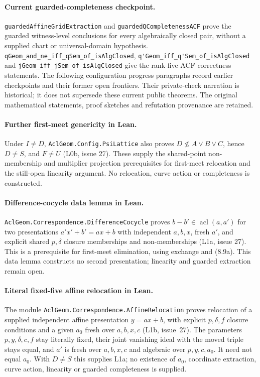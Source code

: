 \documentclass[11pt,oneside]{article}
\theoremstyle{definition}
\theoremstyle{remark}
\newcommand{\acl}{\operatorname{acl}}
\newcommand{\lean}[1]{\nolinkurl{#1}}
\begin{document}
\paragraph{Current guarded-completeness checkpoint.}
\lean{guardedAffineGridExtraction} and \lean{guardedQCompletenessACF} prove the guarded
witness-level conclusions for every algebraically closed pair, without a supplied chart
or universal-domain hypothesis.  \lean{qGeom_and_ne_iff_qSem_of_isAlgClosed},
\lean{q'Geom_iff_q'Sem_of_isAlgClosed} and \lean{jGeom_iff_jSem_of_isAlgClosed} give the
rank-five ACF correctness statements.  The following configuration progress paragraphs
record earlier checkpoints and their former open frontiers.  Their private-check
narration is historical; it does not supersede these current public theorems.  The
original mathematical statements, proof sketches and refutation provenance are retained.

\paragraph{Further first-meet genericity in Lean.}
Under $I\ne D$, \lean{AclGeom.Config.PsiLattice} also proves
$D\nleq A\vee B\vee C$, hence $D\ne S$, and $F\ne U$ (L0b, issue 27).
These supply the shared-point non-membership and multiplier projection
prerequisites for first-meet relocation and the still-open linearity argument.
No relocation, curve action or completeness is constructed.

\paragraph{Difference-cocycle data lemma in Lean.}
\lean{AclGeom.Correspondence.DifferenceCocycle} proves $b-b'\in\acl(a,a')$
for two presentations $a'x'+b'=ax+b$ with independent $a,b,x$, fresh $a'$,
and explicit shared $p,\delta$ closure memberships and non-memberships
(L1a, issue 27).
This is a prerequisite for first-meet elimination, using exchange and (8.9a).
This data lemma constructs no second presentation; linearity and guarded extraction remain open.

\paragraph{Literal fixed-five affine relocation in Lean.}
The module \lean{AclGeom.Correspondence.AffineRelocation} proves relocation of a supplied
independent affine presentation $y=ax+b$, with explicit $p,\delta,f$ closure
conditions and a given $a_0$ fresh over $a,b,x,c$ (L1b, issue~27).
The parameters $p,y,\delta,c,f$ stay literally fixed, their joint vanishing
ideal with the moved triple stays equal, and $a'$ is fresh over $a,b,x,c$
and algebraic over $p,y,c,a_0$. It need not equal $a_0$.
With $D\ne S$ this supplies L1a; no existence of $a_0$, coordinate extraction,
curve action, linearity or guarded completeness is supplied.
\end{document}
